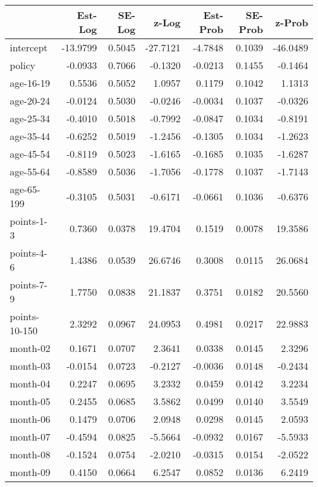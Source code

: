 \documentclass[10pt]{article}
\begin{document}
\begin{table}[ht]
\centering
\begin{tabular}{lrrrrrr}
  \hline
 & Est-Log & SE-Log & z-Log & Est-Prob & SE-Prob & z-Prob \\ 
  \hline
intercept & -13.9799 & 0.5045 & -27.7121 & -4.7848 & 0.1039 & -46.0489 \\ 
  policy & -0.0933 & 0.7066 & -0.1320 & -0.0213 & 0.1455 & -0.1464 \\ 
  age-16-19 & 0.5536 & 0.5052 & 1.0957 & 0.1179 & 0.1042 & 1.1313 \\ 
  age-20-24 & -0.0124 & 0.5030 & -0.0246 & -0.0034 & 0.1037 & -0.0326 \\ 
  age-25-34 & -0.4010 & 0.5018 & -0.7992 & -0.0847 & 0.1034 & -0.8191 \\ 
  age-35-44 & -0.6252 & 0.5019 & -1.2456 & -0.1305 & 0.1034 & -1.2623 \\ 
  age-45-54 & -0.8119 & 0.5023 & -1.6165 & -0.1685 & 0.1035 & -1.6287 \\ 
  age-55-64 & -0.8589 & 0.5036 & -1.7056 & -0.1778 & 0.1037 & -1.7143 \\ 
  age-65-199 & -0.3105 & 0.5031 & -0.6171 & -0.0661 & 0.1036 & -0.6376 \\ 
  points-1-3 & 0.7360 & 0.0378 & 19.4704 & 0.1519 & 0.0078 & 19.3586 \\ 
  points-4-6 & 1.4386 & 0.0539 & 26.6746 & 0.3008 & 0.0115 & 26.0684 \\ 
  points-7-9 & 1.7750 & 0.0838 & 21.1837 & 0.3751 & 0.0182 & 20.5560 \\ 
  points-10-150 & 2.3292 & 0.0967 & 24.0953 & 0.4981 & 0.0217 & 22.9883 \\ 
  month-02 & 0.1671 & 0.0707 & 2.3641 & 0.0338 & 0.0145 & 2.3296 \\ 
  month-03 & -0.0154 & 0.0723 & -0.2127 & -0.0036 & 0.0148 & -0.2434 \\ 
  month-04 & 0.2247 & 0.0695 & 3.2332 & 0.0459 & 0.0142 & 3.2234 \\ 
  month-05 & 0.2455 & 0.0685 & 3.5862 & 0.0499 & 0.0140 & 3.5549 \\ 
  month-06 & 0.1479 & 0.0706 & 2.0948 & 0.0298 & 0.0145 & 2.0593 \\ 
  month-07 & -0.4594 & 0.0825 & -5.5664 & -0.0932 & 0.0167 & -5.5933 \\ 
  month-08 & -0.1524 & 0.0754 & -2.0210 & -0.0315 & 0.0154 & -2.0522 \\ 
  month-09 & 0.4150 & 0.0664 & 6.2547 & 0.0852 & 0.0136 & 6.2419 \\ 

\end{tabular}
\end{table}
\end{document}
